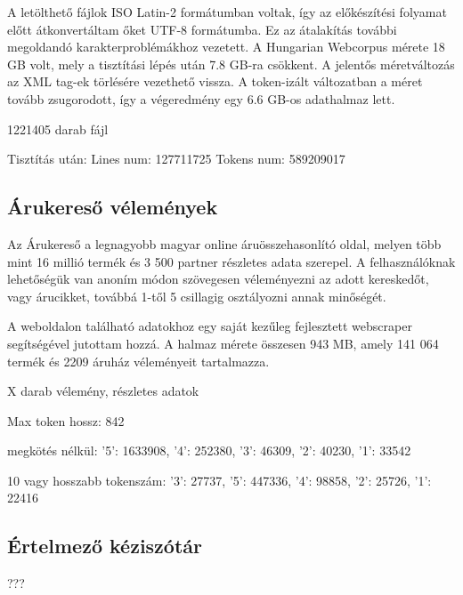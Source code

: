 A letölthető fájlok ISO Latin-2 formátumban voltak, így az előkészítési folyamat előtt átkonvertáltam őket UTF-8 formátumba. Ez az átalakítás további megoldandó karakterproblémákhoz vezetett. A Hungarian Webcorpus mérete 18 GB volt, mely a tisztítási lépés után 7.8 GB-ra csökkent. A jelentős méretváltozás az XML tag-ek törlésére vezethető vissza. A token-izált változatban a méret tovább zsugorodott, így a végeredmény egy 6.6 GB-os adathalmaz lett.

1221405 darab fájl

Tisztítás után:
Lines num: 127711725
Tokens num: 589209017


\subsection{Árukereső vélemények}
Az Árukereső a legnagyobb magyar online áruösszehasonlító oldal, melyen több mint 16 millió termék és 3 500 partner részletes adata szerepel. A felhasználóknak lehetőségük van anoním módon szövegesen véleményezni az adott kereskedőt, vagy árucikket, továbbá 1-től 5 csillagig osztályozni annak minőségét.

A weboldalon található adatokhoz egy saját kezűleg fejlesztett webscraper segítségével jutottam hozzá. A halmaz mérete összesen 943 MB, amely 141 064 termék és 2209 áruház véleményeit tartalmazza.

X darab vélemény, 
részletes adatok

Max token hossz: 842

megkötés nélkül: {'5': 1633908, '4': 252380, '3': 46309, '2': 40230, '1': 33542}

10 vagy hosszabb tokenszám:
{'3': 27737, '5': 447336, '4': 98858, '2': 25726, '1': 22416}



\subsection{Értelmező kéziszótár}

???





